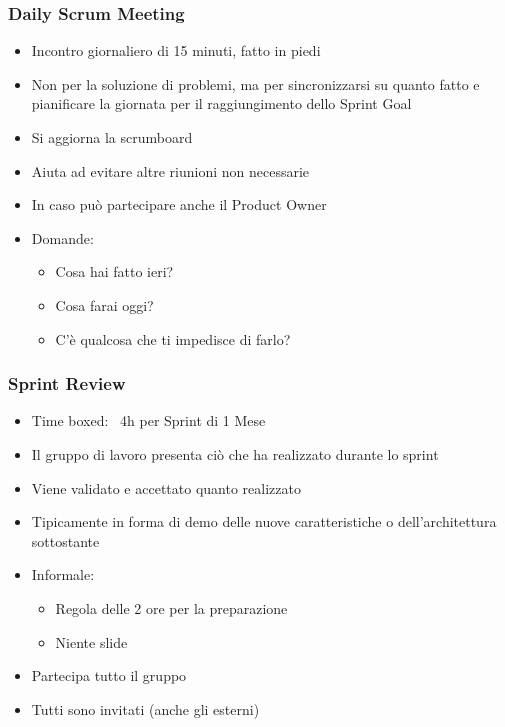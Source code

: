\subsubsection{Daily Scrum Meeting}
\begin{itemize}
    \item Incontro giornaliero di 15 minuti, fatto in piedi
    \item Non per la soluzione di problemi, ma per sincronizzarsi su quanto fatto e pianificare la giornata per il raggiungimento dello Sprint Goal
    \item Si aggiorna la scrumboard
    \item Aiuta ad evitare altre riunioni non necessarie
    \item In caso può partecipare anche il Product Owner
    \item Domande:
    \begin{itemize}
        \item Cosa hai fatto ieri?
        \item Cosa farai oggi?
        \item C'è qualcosa che ti impedisce di farlo?
    \end{itemize}
\end{itemize}

\subsubsection{Sprint Review}
\begin{itemize}
    \item Time boxed: ~4h per Sprint di 1 Mese
    \item Il gruppo di lavoro presenta ciò che ha realizzato durante lo sprint
    \item Viene validato e accettato quanto realizzato
    \item Tipicamente in forma di demo delle nuove caratteristiche o dell'architettura sottostante
    \item Informale:
    \begin{itemize}
        \item Regola delle 2 ore per la preparazione
        \item Niente slide
    \end{itemize}
    \item Partecipa tutto il gruppo
    \item Tutti sono invitati (anche gli esterni)
\end{itemize}


